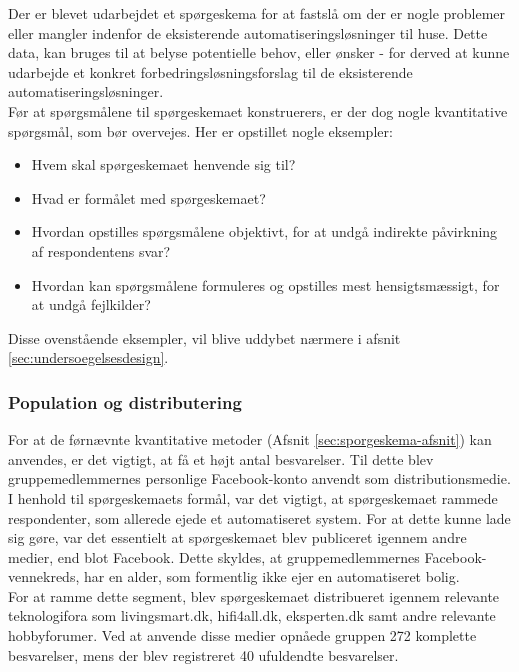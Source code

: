 \label{sec:sporgeskema-afsnit}

Der er blevet udarbejdet et spørgeskema for at fastslå om der er nogle problemer eller mangler indenfor de eksisterende automatiseringsløsninger til huse. Dette data, kan bruges til at belyse potentielle behov, eller ønsker - for derved at kunne udarbejde et konkret forbedringsløsningsforslag til de eksisterende automatiseringsløsninger.\\ 
Før at spørgsmålene til spørgeskemaet konstruerers, er der dog nogle kvantitative spørgsmål, som bør overvejes. Her er opstillet nogle eksempler:

\begin{itemize}
    \item Hvem skal spørgeskemaet henvende sig til?
    \item Hvad er formålet med spørgeskemaet?
    \item Hvordan opstilles spørgsmålene objektivt, for at undgå indirekte påvirkning af respondentens svar?
    \item Hvordan kan spørgsmålene formuleres og opstilles mest hensigtsmæssigt, for at undgå fejlkilder? 
\end{itemize}
    
Disse ovenstående eksempler, vil blive uddybet nærmere i afsnit \ref{sec:undersoegelsesdesign}.

\subsubsection{Population og distributering}
For at de førnævnte kvantitative metoder (Afsnit \ref{sec:sporgeskema-afsnit}) kan anvendes, er det vigtigt, at få et højt antal besvarelser. Til dette blev gruppemedlemmernes personlige Facebook-konto anvendt som distributionsmedie. \\

I henhold til spørgeskemaets formål, var det vigtigt, at spørgeskemaet rammede respondenter, som allerede ejede et automatiseret system. For at dette kunne lade sig gøre, var det essentielt at spørgeskemaet blev publiceret igennem andre medier, end blot Facebook. Dette skyldes, at gruppemedlemmernes Facebook-vennekreds, har en alder, som formentlig ikke ejer en automatiseret bolig. \\

For at ramme dette segment, blev spørgeskemaet distribueret igennem relevante teknologifora som livingsmart.dk, hifi4all.dk, eksperten.dk samt andre relevante hobbyforumer. Ved at anvende disse medier opnåede gruppen 272 komplette besvarelser, mens der blev registreret 40 ufuldendte besvarelser.
